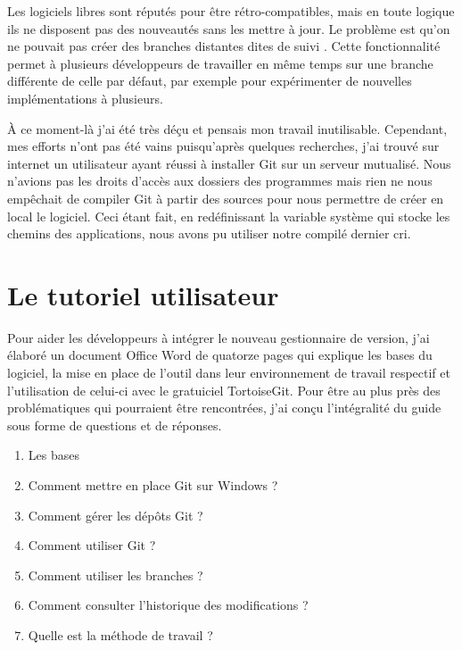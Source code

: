 Les logiciels libres sont réputés pour être rétro-compatibles, mais en
toute logique ils ne disposent pas des nouveautés sans les mettre à
jour.  Le problème est qu'on ne pouvait pas créer des branches distantes
dites \og de suivi \fg{}. Cette fonctionnalité permet à plusieurs
développeurs de travailler en même temps sur une branche différente de
celle par défaut, par exemple pour expérimenter de nouvelles
implémentations à plusieurs.

À ce moment-là j'ai été très déçu et pensais mon travail inutilisable.
Cependant, mes efforts n'ont pas été vains puisqu'après quelques
recherches, j'ai trouvé sur internet un utilisateur ayant réussi à
installer Git sur un serveur mutualisé.  Nous n'avions pas les droits
d'accès aux dossiers des programmes mais rien ne nous empêchait de
compiler Git à partir des sources pour nous permettre de créer en local
le logiciel. Ceci étant fait, en redéfinissant la variable système qui
stocke les chemins des applications, nous avons pu utiliser notre
compilé dernier cri.

\section{Le tutoriel utilisateur} %
\label{sec:Le tutoriel utilisateur}

Pour aider les développeurs à intégrer le nouveau gestionnaire de
version, j'ai élaboré un document Office Word de quatorze pages qui
explique les bases du logiciel, la mise en place de l'outil dans leur
environnement de travail respectif et l'utilisation de celui-ci avec le
gratuiciel TortoiseGit.  Pour être au plus près des problématiques qui
pourraient être rencontrées, j'ai conçu l'intégralité du guide sous
forme de questions et de réponses.

\begin{enumerate}
  \item Les bases
  \item Comment mettre en place Git sur Windows ?
  \item Comment gérer les dépôts Git ?
  \item Comment utiliser Git ?
  \item Comment utiliser les branches ?
  \item Comment consulter l'historique des modifications ?
  \item Quelle est la méthode de travail ?
\end{enumerate}


